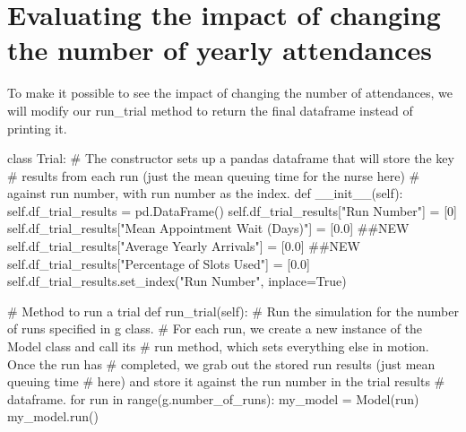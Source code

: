 \documentclass[
  letterpaper,
  DIV=11,
  numbers=noendperiod]{scrreprt}
\newenvironment{Shaded}{}{}
\newcommand{\BuiltInTok}[1]{\textcolor[rgb]{0.84,0.23,0.29}{#1}}
\newcommand{\CommentTok}[1]{\textcolor[rgb]{0.42,0.45,0.49}{#1}}
\newcommand{\ControlFlowTok}[1]{\textcolor[rgb]{0.84,0.23,0.29}{#1}}
\newcommand{\DecValTok}[1]{\textcolor[rgb]{0.00,0.36,0.77}{#1}}
\newcommand{\FloatTok}[1]{\textcolor[rgb]{0.00,0.36,0.77}{#1}}
\newcommand{\FunctionTok}[1]{\textcolor[rgb]{0.44,0.26,0.76}{#1}}
\newcommand{\KeywordTok}[1]{\textcolor[rgb]{0.84,0.23,0.29}{#1}}
\newcommand{\NormalTok}[1]{\textcolor[rgb]{0.14,0.16,0.18}{#1}}
\newcommand{\OperatorTok}[1]{\textcolor[rgb]{0.14,0.16,0.18}{#1}}
\newcommand{\StringTok}[1]{\textcolor[rgb]{0.01,0.18,0.38}{#1}}
\newcommand{\VariableTok}[1]{\textcolor[rgb]{0.89,0.38,0.04}{#1}}
\begin{document}
\section{Evaluating the impact of changing the number of yearly
attendances}\label{evaluating-the-impact-of-changing-the-number-of-yearly-attendances}

To make it possible to see the impact of changing the number of
attendances, we will modify our run\_trial method to return the final
dataframe instead of printing it.

\begin{Shaded}
\begin{Highlighting}[]
\KeywordTok{class}\NormalTok{ Trial:}
    \CommentTok{\# The constructor sets up a pandas dataframe that will store the key}
    \CommentTok{\# results from each run (just the mean queuing time for the nurse here)}
    \CommentTok{\# against run number, with run number as the index.}
    \KeywordTok{def}  \FunctionTok{\_\_init\_\_}\NormalTok{(}\VariableTok{self}\NormalTok{):}
        \VariableTok{self}\NormalTok{.df\_trial\_results }\OperatorTok{=}\NormalTok{ pd.DataFrame()}
        \VariableTok{self}\NormalTok{.df\_trial\_results[}\StringTok{"Run Number"}\NormalTok{] }\OperatorTok{=}\NormalTok{ [}\DecValTok{0}\NormalTok{]}
        \VariableTok{self}\NormalTok{.df\_trial\_results[}\StringTok{"Mean Appointment Wait (Days)"}\NormalTok{] }\OperatorTok{=}\NormalTok{ [}\FloatTok{0.0}\NormalTok{] }\CommentTok{\#\#NEW}
        \VariableTok{self}\NormalTok{.df\_trial\_results[}\StringTok{"Average Yearly Arrivals"}\NormalTok{] }\OperatorTok{=}\NormalTok{ [}\FloatTok{0.0}\NormalTok{] }\CommentTok{\#\#NEW}
        \VariableTok{self}\NormalTok{.df\_trial\_results[}\StringTok{"Percentage of Slots Used"}\NormalTok{] }\OperatorTok{=}\NormalTok{ [}\FloatTok{0.0}\NormalTok{]}
        \VariableTok{self}\NormalTok{.df\_trial\_results.set\_index(}\StringTok{"Run Number"}\NormalTok{, inplace}\OperatorTok{=}\VariableTok{True}\NormalTok{)}

    \CommentTok{\# Method to run a trial}
    \KeywordTok{def}\NormalTok{ run\_trial(}\VariableTok{self}\NormalTok{):}
        \CommentTok{\# Run the simulation for the number of runs specified in g class.}
        \CommentTok{\# For each run, we create a new instance of the Model class and call its}
        \CommentTok{\# run method, which sets everything else in motion.  Once the run has}
        \CommentTok{\# completed, we grab out the stored run results (just mean queuing time}
        \CommentTok{\# here) and store it against the run number in the trial results}
        \CommentTok{\# dataframe.}
        \ControlFlowTok{for}\NormalTok{ run }\KeywordTok{in} \BuiltInTok{range}\NormalTok{(g.number\_of\_runs):}
\NormalTok{            my\_model }\OperatorTok{=}\NormalTok{ Model(run)}
\NormalTok{            my\_model.run()}


\end{Highlighting}
\end{Shaded}
\end{document}
